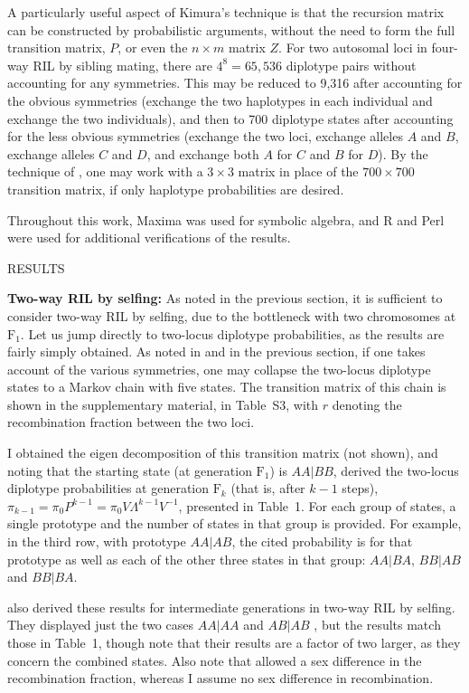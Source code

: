 \documentclass[12pt,letterpaper]{article}
\begin{document}
A particularly useful aspect of Kimura's technique is that 
the recursion matrix can be constructed by probabilistic arguments, without the
need to form the full transition matrix, $P$, or even the $n \times m$
matrix $Z$.  For two autosomal loci in four-way RIL by sibling mating,
there are $4^8 = 65,536$ diplotype pairs without accounting for
any symmetries.  This may be reduced to 9,316 after accounting for the
obvious symmetries (exchange the two haplotypes in each individual and
exchange the two individuals), and then to 700 diplotype states after
accounting for the less obvious symmetries (exchange the two loci,
exchange alleles $A$ and $B$, exchange alleles $C$ and $D$, and
exchange both $A$ for $C$ and $B$ for $D$).  By the technique of
\citet{Kimura1963}, 
one may work with a $3 \times 3$ matrix in place of the $700
\times 700$ transition matrix, if only haplotype probabilities are
desired.  

Throughout this work, Maxima \citep{Maxima} was used 
for symbolic algebra, and R \citep{R} and Perl \citep{Perl} were used for
additional verifications of the results.


\clearpage
\centerline{RESULTS}

\textbf{Two-way RIL by selfing:} As noted in the previous section, it
is sufficient to consider two-way RIL by selfing, due to the
bottleneck with two chromosomes at $\text{F}_1$.  Let us jump
directly to two-locus diplotype probabilities, as the results are
fairly simply obtained.  As noted in \citet{Haldane1931} and in the
previous section, if one takes account of the various symmetries, one
may collapse the two-locus diplotype states to a Markov chain with
five states.  The transition matrix of this chain is shown in the
supplementary material, in Table~S3, with $r$ denoting the
recombination fraction between the two loci.

I obtained the eigen decomposition of this transition matrix (not shown), and noting
that the starting state (at generation $\text{F}_1$) is $AA|BB$, 
derived the two-locus diplotype probabilities at generation $\text{F}_k$
(that is, after $k-1$ steps), $\pi_{k-1} = \pi_0 P^{k-1} = \pi_0 V
\Lambda^{k-1} V^{-1}$, presented in Table~1.  For each group of
states, a single prototype and the number
of states in that group is provided. For example, in the third row, with prototype
$AA|AB$, the cited probability is for that prototype as well as each of the
other three states in that group: $AA|BA$, $BB|AB$ and $BB|BA$.  

\citet{Haldane1931} also derived these results for intermediate
generations in two-way RIL by selfing.  They displayed just the two
cases $AA|AA$ and $AB|AB$ \citep[][equation 1.4]{Haldane1931}, but the
results match those in Table~1, though note that their results are a
factor of two larger, as they concern the combined states.  Also note
that \citet{Haldane1931} allowed a sex difference in the recombination
fraction, whereas I assume no sex difference in recombination.  
\end{document}
